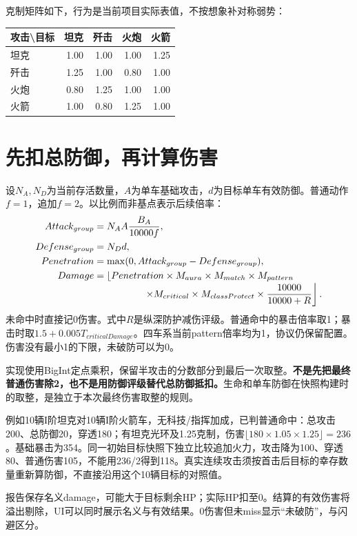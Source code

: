 克制矩阵如下，行为是当前项目实际表值，不按想象补对称弱势：
\begin{center}\begin{tabular}{lrrrr}\toprule 攻击\textbackslash 目标 & 坦克 & 歼击 & 火炮 & 火箭\\\midrule
坦克 & 1.00&1.00&1.00&1.25\\
歼击 & 1.25&1.00&0.80&1.00\\
火炮 & 0.80&1.25&1.00&1.00\\
火箭 & 1.00&0.80&1.25&1.00\\\bottomrule\end{tabular}\end{center}

\section{先扣总防御，再计算伤害}
设\(N_A,N_D\)为当前存活数量，\(A\)为单车基础攻击，\(d\)为目标单车有效防御。普通动作\(f=1\)，追加\(f=2\)。以比例而非基点表示后续倍率：
\begin{align}
Attack_{group}&=N_AA\frac{B_A}{10000f},\\
Defense_{group}&=N_Dd,\\
Penetration&=\max(0,Attack_{group}-Defense_{group}),\\
Damage&=\left\lfloor Penetration\times M_{aura}\times M_{match}\times M_{pattern}
 \right.\notag\\[-3pt]
 &\hspace{18mm}\left.\times M_{critical}\times M_{classProtect}\times\frac{10000}{10000+R}\right\rfloor.
\end{align}
未命中时直接记0伤害。式中\(R\)是纵深防护减伤评级。普通命中的暴击倍率取1；暴击时取\(1.5+0.005T_{criticalDamage}\)。四车系当前pattern倍率均为1，协议仍保留配置。伤害没有最小1的下限，未破防可以为0。

实现使用BigInt定点乘积，保留半攻击的分数部分到最后一次取整。\textbf{不是先把最终普通伤害除2，也不是用防御评级替代总防御抵扣。}生命和单车防御在快照构建时的取整，是独立于本次最终伤害取整的规则。

例如10辆I阶坦克对10辆I阶火箭车，无科技/指挥加成，已判普通命中：总攻击200、总防御20，穿透180；有坦克光环及1.25克制，伤害\(\lfloor180\times1.05\times1.25\rfloor=236\)。基础暴击为354。同一初始目标快照下独立比较追加火力，攻击降为100、穿透80、普通伤害105，不能用236/2得到118。真实连续攻击须按首击后目标的幸存数量重新算防御，不直接沿用这个10辆目标的对照值。

报告保存名义damage，可能大于目标剩余HP；实际HP扣至0。结算的有效伤害将溢出剔除，UI可以同时展示名义与有效结果。0伤害但未miss显示“未破防”，与闪避区分。

